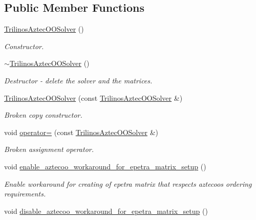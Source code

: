 \subsection*{Public Member Functions}
\begin{DoxyCompactItemize}
\item 
\hyperlink{classoomph_1_1TrilinosAztecOOSolver_a2abd3c0ee288fdaceefbde6f4e854e2c}{Trilinos\+Aztec\+O\+O\+Solver} ()
\begin{DoxyCompactList}\small\item\em Constructor. \end{DoxyCompactList}\item 
\hyperlink{classoomph_1_1TrilinosAztecOOSolver_a7b06c1e69e25f407083453f98cfdb144}{$\sim$\+Trilinos\+Aztec\+O\+O\+Solver} ()
\begin{DoxyCompactList}\small\item\em Destructor -\/ delete the solver and the matrices. \end{DoxyCompactList}\item 
\hyperlink{classoomph_1_1TrilinosAztecOOSolver_a279ea22b7a926855dbae823902b7834e}{Trilinos\+Aztec\+O\+O\+Solver} (const \hyperlink{classoomph_1_1TrilinosAztecOOSolver}{Trilinos\+Aztec\+O\+O\+Solver} \&)
\begin{DoxyCompactList}\small\item\em Broken copy constructor. \end{DoxyCompactList}\item 
void \hyperlink{classoomph_1_1TrilinosAztecOOSolver_a3cdd18905633b615dbdf5bdb2d80d4d3}{operator=} (const \hyperlink{classoomph_1_1TrilinosAztecOOSolver}{Trilinos\+Aztec\+O\+O\+Solver} \&)
\begin{DoxyCompactList}\small\item\em Broken assignment operator. \end{DoxyCompactList}\item 
void \hyperlink{classoomph_1_1TrilinosAztecOOSolver_aa3cd029cc48f36cc41d75e8c83faa037}{enable\+\_\+aztecoo\+\_\+workaround\+\_\+for\+\_\+epetra\+\_\+matrix\+\_\+setup} ()
\begin{DoxyCompactList}\small\item\em Enable workaround for creating of epetra matrix that respects aztecoo\textquotesingle{}s ordering requirements. \end{DoxyCompactList}\item 
void \hyperlink{classoomph_1_1TrilinosAztecOOSolver_a25ba106bb6f1cd4b99dd1af343aeeb7c}{disable\+\_\+aztecoo\+\_\+workaround\+\_\+for\+\_\+epetra\+\_\+matrix\+\_\+setup} ()

\end{DoxyCompactItemize}
